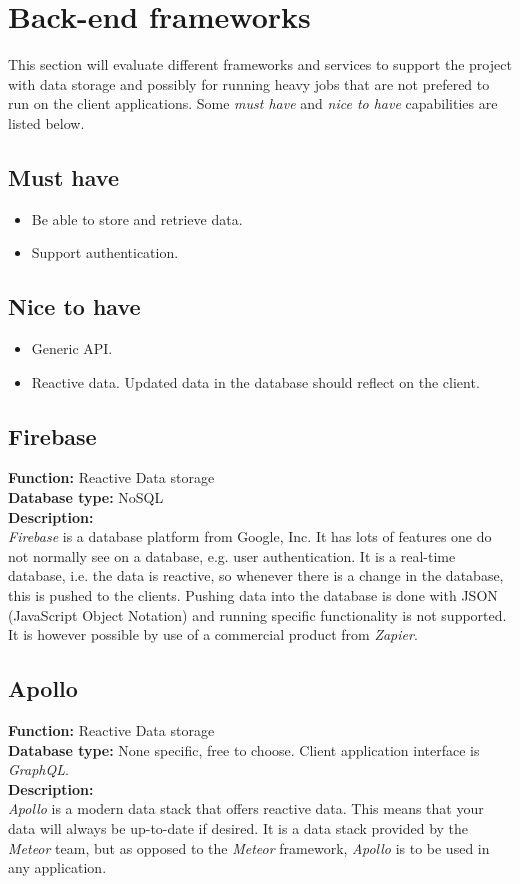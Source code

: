 \section{Back-end frameworks}
This section will evaluate different frameworks and services to support the project with data storage and possibly for running heavy jobs that are not prefered to run on the client applications.
Some \textit{must have} and \textit{nice to have} capabilities are listed below.
	
\subsection*{Must have}
	\begin{itemize}
	\item Be able to store and retrieve data.
	\item Support authentication.
	\end{itemize}
	
\subsection*{Nice to have}	
	\begin{itemize}
	\item Generic API.
	\item Reactive data. Updated data in the database should reflect on the client.
	\end{itemize}
	

\subsection*{Firebase}
\textbf{Function:} Reactive Data storage
\\
\textbf{Database type:} NoSQL
\\
\textbf{Description:}
\\
\textit{Firebase} is a database platform from Google, Inc. 
It has lots of features one do not normally see on a database, e.g. user authentication.
It is a real-time database, i.e. the data is reactive, so whenever there is a change in the database, this is pushed to the clients. Pushing data into the database is done with JSON (JavaScript Object Notation) and running specific functionality is not supported.
It is however possible by use of a commercial product from  \textit{Zapier}.

\subsection*{Apollo}
\textbf{Function:} Reactive Data storage
\\
\textbf{Database type:} None specific, free to choose.
Client application interface is \textit{GraphQL}.
\\
\textbf{Description:}
\\
\textit{Apollo} is a modern data stack that offers reactive data. 
This means that your data will always be up-to-date if desired.
It is a data stack provided by the \textit{Meteor} team, but as opposed to the \textit{Meteor} framework, \textit{Apollo} is to be used in any application. 

